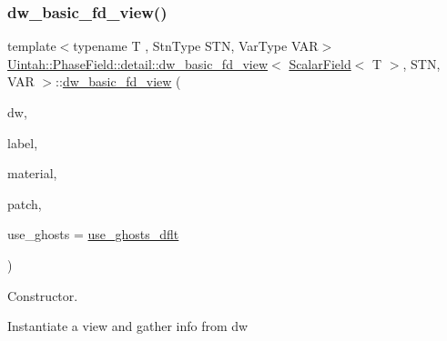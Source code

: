 \subsubsection{\texorpdfstring{dw\+\_\+basic\+\_\+fd\+\_\+view()}{dw\_basic\_fd\_view()}\hspace{0.1cm}{\footnotesize\ttfamily [3/4]}}
{\footnotesize\ttfamily template$<$typename T , Stn\+Type S\+TN, Var\+Type V\+AR$>$ \\
\hyperlink{classUintah_1_1PhaseField_1_1detail_1_1dw__basic__fd__view}{Uintah\+::\+Phase\+Field\+::detail\+::dw\+\_\+basic\+\_\+fd\+\_\+view}$<$ \hyperlink{structUintah_1_1PhaseField_1_1ScalarField}{Scalar\+Field}$<$ T $>$, S\+TN, V\+AR $>$\+::\hyperlink{classUintah_1_1PhaseField_1_1detail_1_1dw__basic__fd__view}{dw\+\_\+basic\+\_\+fd\+\_\+view} (\begin{DoxyParamCaption}\item[{Data\+Warehouse $\ast$}]{dw,  }\item[{const typename \hyperlink{structUintah_1_1PhaseField_1_1ScalarField_a7a77875e030da64c47ce9f6c22a06959}{Field\+::label\+\_\+type} \&}]{label,  }\item[{int}]{material,  }\item[{const Patch $\ast$}]{patch,  }\item[{bool}]{use\+\_\+ghosts = {\ttfamily \hyperlink{classUintah_1_1PhaseField_1_1detail_1_1dw__basic__fd__view_3_01ScalarField_3_01T_01_4_00_01STN_00_01VAR_01_4_a2e418e1016be0d58b9f1fbcaf16f2fa5}{use\+\_\+ghosts\+\_\+dflt}} }\end{DoxyParamCaption})\hspace{0.3cm}{\ttfamily [inline]}}



Constructor. 

Instantiate a view and gather info from dw


